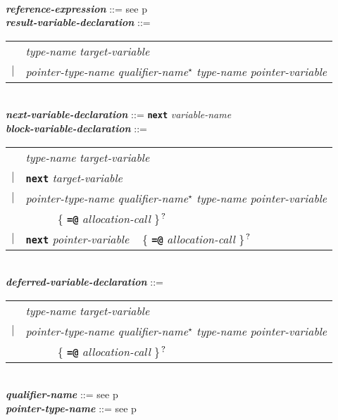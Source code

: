 \documentclass[12pt]{article}
\newcommand{\TT}[1]{{\tt \bfseries #1}}
\newcommand{\STAR}{{\Large $^\star$}}
\newcommand{\QMARK}{{$^{\,\mbox{\footnotesize ?}}$}}
\newcommand{\ttkey}[1]{{\tt \bfseries #1}}
\newcommand{\emkey}[1]{{\em \bfseries #1}}
\newcommand{\pagref}[1]{p\pageref{#1}}
\newenvironment{indpar}[1][0.3in]%
	{\begin{list}{}%
		     {\setlength{\itemsep}{0in}%
		      \setlength{\topsep}{0in}%
		      \setlength{\parsep}{1ex}%
		      \setlength{\labelwidth}{#1}%
		      \setlength{\leftmargin}{#1}%
		      \addtolength{\leftmargin}{\labelsep}}%
	 \item}%
	{\end{list}}
\begin{document}
\begin{indpar}
\begin{tabular}[t]{@{}rll}
    \end{tabular}
\\[0.5ex]
\emkey{reference-expression} ::= see \pagref{REFERENCE-EXPRESSIONS}
\\[0.5ex]
\emkey{result-variable-declaration}\label{RESULT-VARIABLE-DECLARATION} ::= \\
\hspace*{0.5in}\begin{tabular}{rl}
	    & {\em type-name} {\em target-variable} \\
	$|$ & {\em pointer-type-name} {\em qualifier-name}\STAR{}
	      {\em type-name} {\em pointer-variable}
	\end{tabular}
\\[0.5ex]
\emkey{next-variable-declaration}\label{NEXT-VARIABLE-DECLARATION}
    ::= \ttkey{next} {\em variable-name}
\\[0.5ex]
\emkey{block-variable-declaration}\label{BLOCK-VARIABLE-DECLARATION} ::= \\
\hspace*{0.5in}\begin{tabular}{rl}
	    & {\em type-name} {\em target-variable} \\
	$|$ & \TT{next} {\em target-variable} \\
	$|$ & {\em pointer-type-name} {\em qualifier-name}\STAR{}
	      {\em type-name} {\em pointer-variable} \\
	    & ~~~~~ \{ \TT{=@} {\em allocation-call} \}\QMARK{} \\
	$|$ & \TT{next} {\em pointer-variable}
	      ~ \{ \TT{=@} {\em allocation-call} \}\QMARK{} \\
	\end{tabular}
\\[0.5ex]
\emkey{deferred-variable-declaration}%
    \label{DEFERRED-VARIABLE-DECLARATION} ::= \\
\hspace*{0.5in}\begin{tabular}{rl}
	    & {\em type-name} {\em target-variable} \\
	$|$ & {\em pointer-type-name} {\em qualifier-name}\STAR{}
	      {\em type-name} {\em pointer-variable} \\
	    & ~~~~~ \{ \TT{=@} {\em allocation-call} \}\QMARK{} \\
	\end{tabular}
\\[0.5ex]
\emkey{qualifier-name} ::= see \pagref{QUALIFIER-NAME}
\\[0.5ex]
\emkey{pointer-type-name} ::= see \pagref{POINTER-TYPE-NAME}

\end{indpar}
\end{document}
